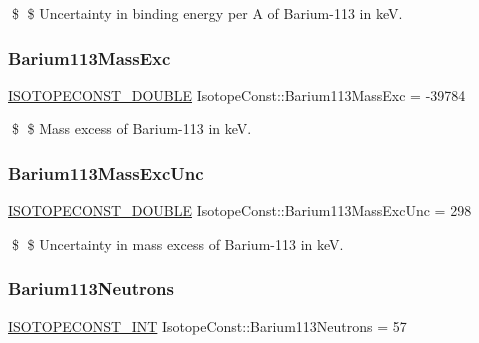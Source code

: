 \$ \$ Uncertainty in binding energy per A of Barium-\/113 in keV. \mbox{\label{group___isotope_const-_barium-_ba113_ga27907be803a7676a9b5e2c75ceb97059}} 
\subsubsection{\texorpdfstring{Barium113\+Mass\+Exc}{Barium113MassExc}}
{\footnotesize\ttfamily \mbox{\hyperlink{group___isotope_const-_macros_ga8f45a7272ce02c0b4c65c44636ed719a}{I\+S\+O\+T\+O\+P\+E\+C\+O\+N\+S\+T\+\_\+\+D\+O\+U\+B\+LE}} Isotope\+Const\+::\+Barium113\+Mass\+Exc = -\/39784}

\$ \$ Mass excess of Barium-\/113 in keV. \mbox{\label{group___isotope_const-_barium-_ba113_ga51fbc08fed3e07ef6fd7755480e8739f}} 
\subsubsection{\texorpdfstring{Barium113\+Mass\+Exc\+Unc}{Barium113MassExcUnc}}
{\footnotesize\ttfamily \mbox{\hyperlink{group___isotope_const-_macros_ga8f45a7272ce02c0b4c65c44636ed719a}{I\+S\+O\+T\+O\+P\+E\+C\+O\+N\+S\+T\+\_\+\+D\+O\+U\+B\+LE}} Isotope\+Const\+::\+Barium113\+Mass\+Exc\+Unc = 298}

\$ \$ Uncertainty in mass excess of Barium-\/113 in keV. \mbox{\label{group___isotope_const-_barium-_ba113_gae8ed1f0a9f3c737acd9dc30771db5d12}} 
\subsubsection{\texorpdfstring{Barium113\+Neutrons}{Barium113Neutrons}}
{\footnotesize\ttfamily \mbox{\hyperlink{group___isotope_const-_macros_ga5f18360b3e99483a35c32d789e62621c}{I\+S\+O\+T\+O\+P\+E\+C\+O\+N\+S\+T\+\_\+\+I\+NT}} Isotope\+Const\+::\+Barium113\+Neutrons = 57}

